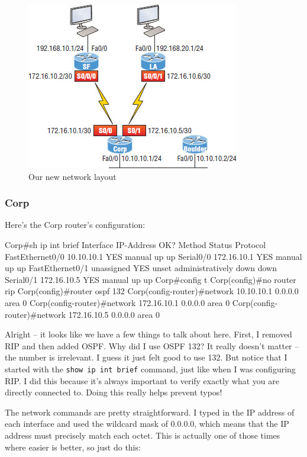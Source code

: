 \begin{figure}
   \centering
   \includegraphics[width=.6\textwidth]{images/c18f004.jpg}
   \caption{Our new network layout}
   \label{fig:ospf-new-network-layout}
\end{figure}


\subsubsection{Corp}

Here's the Corp router's configuration:

\begin{cli}
Corp#sh ip int brief
Interface        IP-Address      OK? Method Status                Protocol
FastEthernet0/0  10.10.10.1      YES manual up                    up
Serial0/0        172.16.10.1     YES manual up                    up
FastEthernet0/1  unassigned      YES unset  administratively down down
Serial0/1        172.16.10.5     YES manual up                    up
Corp#config t
Corp(config)#no router rip
Corp(config)#router ospf 132
Corp(config-router)#network 10.10.10.1 0.0.0.0 area 0
Corp(config-router)#network 172.16.10.1 0.0.0.0 area 0
Corp(config-router)#network 172.16.10.5 0.0.0.0 area 0
\end{cli}

Alright -- it looks like we have a few things to talk about here. First,
I removed RIP and then added OSPF. Why did I use OSPF 132? It really
doesn't matter -- the number is irrelevant. I guess it just felt good to
use 132. But notice that I started with the
\texttt{show\ ip\ int\ brief} command, just like when I was configuring
RIP. I did this because it's always
\protect\hypertarget{c18.xhtmlux5cux23Page_759}{}{}important to verify
exactly what you are directly connected to. Doing this really helps
prevent typos!

The network commands are pretty straightforward. I typed in the IP
address of each interface and used the wildcard mask of 0.0.0.0, which
means that the IP address must precisely match each octet. This is
actually one of those times where easier is better, so just do this:

